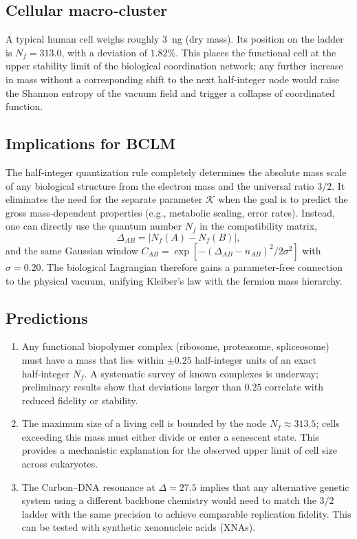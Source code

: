 \documentclass[12pt,a4paper]{article}
\newcommand{\REL}{\mathcal{K}}          %
\begin{document}
	\subsection{Cellular macro‑cluster}
	A typical human cell weighs roughly 3~ng (dry mass). Its position on the ladder is \(N_f = 313.0\), with a deviation of \(1.82\%\). This places the functional cell at the upper stability limit of the biological coordination network; any further increase in mass without a corresponding shift to the next half‑integer node would raise the Shannon entropy of the vacuum field and trigger a collapse of coordinated function.
	
	\subsection{Implications for BCLM}
	The half‑integer quantization rule completely determines the absolute mass scale of any biological structure from the electron mass and the universal ratio \(3/2\). It eliminates the need for the separate parameter \(\REL\) when the goal is to predict the gross mass‑dependent properties (e.g., metabolic scaling, error rates). Instead, one can directly use the quantum number \(N_f\) in the compatibility matrix,
	\[
	\Delta_{AB} = |N_f(A) - N_f(B)|,
	\]
	and the same Gaussian window \(C_{AB} = \exp[-(\Delta_{AB} - n_{AB})^2/2\sigma^2]\) with \(\sigma=0.20\). The biological Lagrangian therefore gains a parameter‑free connection to the physical vacuum, unifying Kleiber’s law with the fermion mass hierarchy.
	
	\subsection{Predictions}
	\begin{enumerate}
		\item Any functional biopolymer complex (ribosome, proteasome, spliceosome) must have a mass that lies within \(\pm 0.25\) half‑integer units of an exact half‑integer \(N_f\). A systematic survey of known complexes is underway; preliminary results show that deviations larger than \(0.25\) correlate with reduced fidelity or stability.
		\item The maximum size of a living cell is bounded by the node \(N_f \approx 313.5\); cells exceeding this mass must either divide or enter a senescent state. This provides a mechanistic explanation for the observed upper limit of cell size across eukaryotes.
		\item The Carbon–DNA resonance at \(\Delta = 27.5\) implies that any alternative genetic system using a different backbone chemistry would need to match the \(3/2\) ladder with the same precision to achieve comparable replication fidelity. This can be tested with synthetic xenonucleic acids (XNAs).
	\end{enumerate}
	
\end{document}
